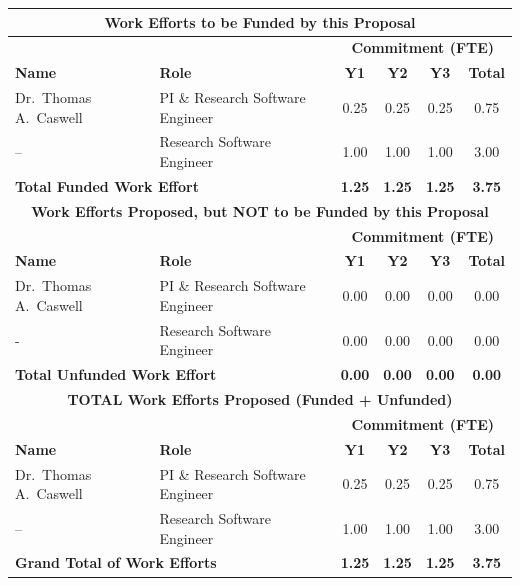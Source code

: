 \documentclass[12pt]{article}
\numberwithin{page}{section}
\begin{document}
\begin{tabular}{|l|l|c|c|c|c|}
  \hline
  \multicolumn{6}{|c|}{\cellcolor{gray!30}\textbf{Work Efforts to be Funded by this Proposal}}\\
  \hline
  \cellcolor{gray!30} &  \cellcolor{gray!30}&\multicolumn{4}{c|}{\cellcolor{gray!30}\textbf{Commitment (FTE)}} \\
  \hhline{|*2{>{\arrayrulecolor{gray!30}}-}*4{>{\arrayrulecolor{black}}-}|}
  \cellcolor{gray!30}\textbf{Name }& \cellcolor{gray!30}\textbf{Role} & \cellcolor{gray!30}\textbf{Y1} & \cellcolor{gray!30}\textbf{Y2} & \cellcolor{gray!30}\textbf{Y3} & \cellcolor{gray!30}\textbf{Total}     \\  \hline
  Dr.\ Thomas A.\ Caswell & PI \& Research Software Engineer & 0.25 & 0.25 & 0.25 & 0.75 \\  \hline
  -- & Research Software Engineer & 1.00 & 1.00 & 1.00 & 3.00 \\  \hline
  \multicolumn{2}{|l|}{\textbf{Total Funded Work Effort}} & \textbf{1.25} & \textbf{1.25} & \textbf{1.25}& \textbf{3.75}\\    \hline
  \multicolumn{6}{|c|}{\cellcolor{gray!30}\textbf{Work Efforts Proposed, but NOT to be Funded by this Proposal}}\\  \hline
  \cellcolor{gray!30} &  \cellcolor{gray!30}&\multicolumn{4}{c|}{\cellcolor{gray!30}\textbf{Commitment (FTE)}} \\
  \hhline{|*2{>{\arrayrulecolor{gray!30}}-}*4{>{\arrayrulecolor{black}}-}|}
  \cellcolor{gray!30}\textbf{Name }& \cellcolor{gray!30}\textbf{Role} & \cellcolor{gray!30}\textbf{Y1} & \cellcolor{gray!30}\textbf{Y2} & \cellcolor{gray!30}\textbf{Y3} & \cellcolor{gray!30}\textbf{Total}     \\  \hline
  Dr.\ Thomas A.\ Caswell & PI \& Research Software Engineer & 0.00 & 0.00 & 0.00 & 0.00 \\  \hline
  - & Research Software Engineer & 0.00 & 0.00 & 0.00 & 0.00 \\  \hline
  \multicolumn{2}{|l|}{\textbf{Total Unfunded Work Effort}} & \textbf{0.00} & \textbf{0.00} & \textbf{0.00}& \textbf{0.00}\\\hline
  \multicolumn{6}{|c|}{\cellcolor{gray!30}\textbf{TOTAL Work Efforts Proposed (Funded + Unfunded)}}\\  \hline
  \cellcolor{gray!30} &  \cellcolor{gray!30}&\multicolumn{4}{c|}{\cellcolor{gray!30}\textbf{Commitment (FTE)}} \\\hhline{|*2{>{\arrayrulecolor{gray!30}}-}*4{>{\arrayrulecolor{black}}-}|}
  \cellcolor{gray!30}\textbf{Name }& \cellcolor{gray!30}\textbf{Role} & \cellcolor{gray!30}\textbf{Y1} & \cellcolor{gray!30}\textbf{Y2} & \cellcolor{gray!30}\textbf{Y3} & \cellcolor{gray!30}\textbf{Total}     \\      \hline
  Dr.\ Thomas A.\ Caswell & PI \& Research Software Engineer & 0.25 & 0.25 & 0.25 & 0.75 \\  \hline
  -- & Research Software Engineer & 1.00 & 1.00 & 1.00 & 3.00 \\  \hline
  \multicolumn{2}{|l|}{\textbf{Grand Total of Work Efforts}} & \textbf{1.25} & \textbf{1.25} & \textbf{1.25}& \textbf{3.75}\\  \hline
\end{tabular}
\end{document}
